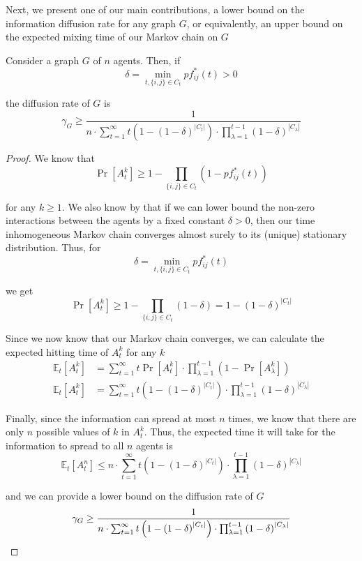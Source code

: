 \documentclass[format=acmsmall, review=false]{acmart}
\begin{document}
\par Next, we present one of our main contributions, a lower bound on the information diffusion rate for any graph $G$,
or equivalently, an upper bound on the expected mixing time of our Markov chain on $G$

\begin{theorem}
Consider a graph $G$ of $n$ agents. Then, if
\[
\delta = \min_{t, \{ i, j \} \in C_t} {p f^*_{ij}(t)} > 0
\]

the diffusion rate of $G$ is
\[
\gamma_G \geq \frac{1}{ n \cdot \sum_{t = 1}^{\infty} {t \left( 1 - {\left( 1 - \delta \right)}^{|C_t|} \right) \cdot \prod_{\lambda = 1}^{t-1} { {\left( 1 - \delta \right)}^{|C_\lambda|} } } }
\]
\end{theorem}


\begin{proof}
\par We know that
\[
\Pr \left[ A^k_t \right] \geq 1 - \prod_{ \{i, j \} \in C_t} {\left( 1 - p f^*_{ij}(t) \right) }
\]

for any $k \geq 1$. We also know by \cite{SC1} that if we can lower bound the non-zero interactions between the agents by
a fixed constant $\delta > 0$, then our time inhomogeneous Markov chain converges almost surely to its (unique) stationary
distribution. Thus, for
\[
\delta = \min_{t, \{ i, j \} \in C_t} {p f^*_{ij}(t)}
\]

we get
\begin{equation}\label{probA}
\Pr \left[ A^k_t \right] \geq 1 - \prod_{ \{ i, j \} \in C_t } {\left( 1 - \delta \right) } = 1 - { \left( 1 - \delta \right) }^{|C_t|}
\end{equation}

\par Since we now know that our Markov chain converges, we can calculate the expected hitting time of $A^k_t$ for any
$k$
\begin{align}\label{hittime}
\mathbb{E}_t \left[ A^k_t \right] & = \sum_{t = 1}^{\infty} {t \Pr \left[ A^k_t \right] \cdot \prod_{\lambda = 1}^{t-1} {\left( 1 - \Pr \left[ A^k_\lambda \right] \right)} } \\ \nonumber
\mathbb{E}_t \left[ A^k_t \right] & = \sum_{t = 1}^{\infty} {t \left( 1 - {\left( 1 - \delta \right)}^{|C_t|} \right) \cdot \prod_{\lambda = 1}^{t-1} { {\left( 1 - \delta \right)}^{|C_\lambda|} } }
\end{align}

\par Finally, since the information can spread at most $n$ times, we know that there are only $n$ possible values of $k$
in $A^k_t$. Thus, the expected time it will take for the information to spread to all $n$ agents is
\[
\mathbb{E}_t \left[ A^n_t \right] \leq n \cdot \sum_{t = 1}^{\infty} {t \left( 1 - {\left( 1 - \delta \right)}^{|C_t|} \right) \cdot \prod_{\lambda = 1}^{t-1} { {\left( 1 - \delta \right)}^{|C_\lambda|} } }
\]

and we can provide a lower bound on the diffusion rate of $G$
\[
\gamma_G \geq \frac{1}{ n \cdot \sum_{t = 1}^{\infty} {t \left( 1 - {\left( 1 - \delta \right)}^{|C_t|} \right) \cdot \prod_{\lambda = 1}^{t-1} { {\left( 1 - \delta \right)}^{|C_\lambda|} } } } \qedhere
\]
\end{proof}
\end{document}
